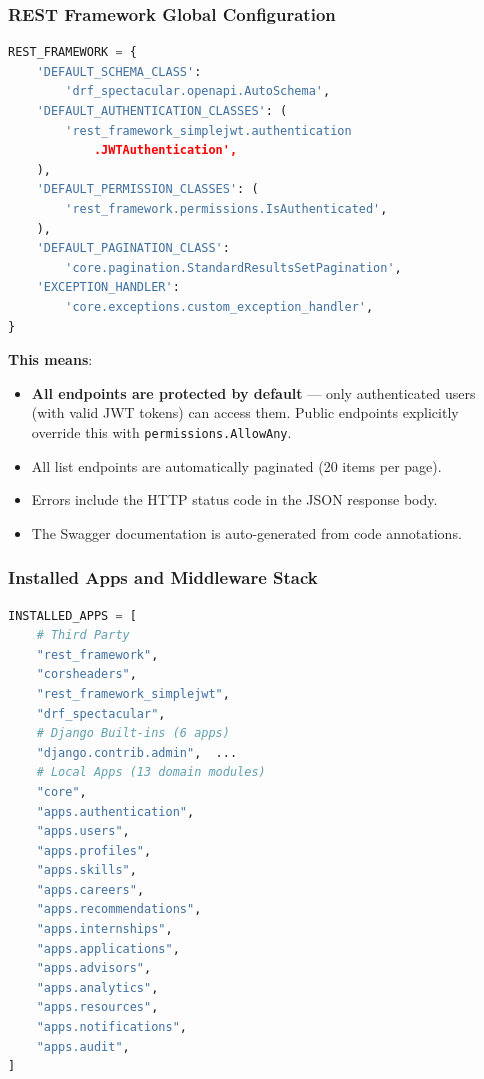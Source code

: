 \documentclass[12pt, a4paper]{article}
\begin{document}
\subsubsection{REST Framework Global Configuration}

\begin{lstlisting}[language=Python, caption={REST Framework Configuration in base.py}]
REST_FRAMEWORK = {
    'DEFAULT_SCHEMA_CLASS':
        'drf_spectacular.openapi.AutoSchema',
    'DEFAULT_AUTHENTICATION_CLASSES': (
        'rest_framework_simplejwt.authentication
            .JWTAuthentication',
    ),
    'DEFAULT_PERMISSION_CLASSES': (
        'rest_framework.permissions.IsAuthenticated',
    ),
    'DEFAULT_PAGINATION_CLASS':
        'core.pagination.StandardResultsSetPagination',
    'EXCEPTION_HANDLER':
        'core.exceptions.custom_exception_handler',
}
\end{lstlisting}

\textbf{This means}:
\begin{itemize}
    \item \textbf{All endpoints are protected by default} --- only authenticated users (with valid JWT tokens) can access them. Public endpoints explicitly override this with \texttt{permissions.AllowAny}.
    \item All list endpoints are automatically paginated (20 items per page).
    \item Errors include the HTTP status code in the JSON response body.
    \item The Swagger documentation is auto-generated from code annotations.
\end{itemize}

\subsubsection{Installed Apps and Middleware Stack}

\begin{lstlisting}[language=Python, caption={13 Local Apps Registered in base.py}]
INSTALLED_APPS = [
    # Third Party
    "rest_framework",
    "corsheaders",
    "rest_framework_simplejwt",
    "drf_spectacular",
    # Django Built-ins (6 apps)
    "django.contrib.admin",  ...
    # Local Apps (13 domain modules)
    "core",
    "apps.authentication",
    "apps.users",
    "apps.profiles",
    "apps.skills",
    "apps.careers",
    "apps.recommendations",
    "apps.internships",
    "apps.applications",
    "apps.advisors",
    "apps.analytics",
    "apps.resources",
    "apps.notifications",
    "apps.audit",
]
\end{lstlisting}
\end{document}
